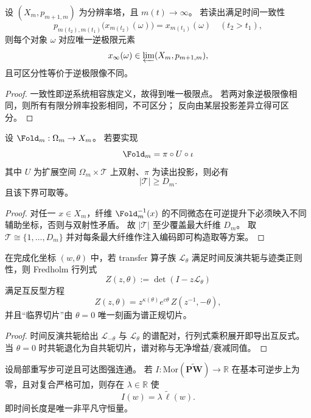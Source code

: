 \begin{theorem}\label{thm:xi-time-consistent-inverse-limit-readout}
设 \((X_m,p_{m+1,m})\) 为分辨率塔，且 \(m(t)\to\infty\)。
若读出满足时间一致性
\[
p_{m(t_2),m(t_1)}\bigl(x_{m(t_2)}(\omega)\bigr)=x_{m(t_1)}(\omega)\quad(t_2>t_1),
\]
则每个对象 \(\omega\) 对应唯一逆极限元素
\[
x_\infty(\omega)\in \varprojlim(X_m,p_{m+1,m}),
\]
且可区分性等价于逆极限像不同。
\end{theorem}

\begin{proof}
一致性即逆系统相容族定义，故得到唯一极限点。
若两对象逆极限像相同，则所有有限分辨率投影相同，不可区分；
反向由某层投影差异立得可区分。
\end{proof}

\begin{theorem}[时间纤维最小维数定理]\label{thm:xi-time-fiber-minimal-dimension}
设 \(\Fold_m:\Omega_m\to X_m\)。
若要实现
\[
\Fold_m=\pi\circ U\circ\iota
\]
其中 \(U\) 为扩展空间 \(\Omega_m\times\mathcal T\) 上双射、\(\pi\) 为读出投影，则必有
\[
|\mathcal T|\ge D_m.
\]
且该下界可取等。
\end{theorem}

\begin{proof}
对任一 \(x\in X_m\)，纤维 \(\Fold_m^{-1}(x)\) 的不同微态在可逆提升下必须映入不同辅助坐标，否则与双射性矛盾。
故 \(|\mathcal T|\) 至少覆盖最大纤维 \(D_m\)。
取 \(\mathcal T\cong\{1,\dots,D_m\}\) 并对每条最大纤维作注入编码即可构造取等方案。
\end{proof}

\begin{proposition}[时间反演参数化下的谱互反律]\label{prop:xi-time-reversal-spectral-reciprocity}
在完成化坐标 \((w,\theta)\) 中，若 transfer 算子族 \(\mathcal L_\theta\) 满足时间反演共轭与迹类正则性，则 Fredholm 行列式
\[
Z(z,\theta):=\det(I-z\mathcal L_\theta)
\]
满足互反型方程
\[
Z(z,\theta)=z^{\kappa(\theta)}e^{c\theta}\,Z(z^{-1},-\theta),
\]
并且“临界切片”由 \(\theta=0\) 唯一刻画为谱正规切片。
\end{proposition}

\begin{proof}
时间反演共轭给出 \(\mathcal L_{-\theta}\) 与 \(\mathcal L_\theta\) 的谱配对，行列式乘积展开即导出互反式。
当 \(\theta=0\) 时共轭退化为自共轭切片，谱对称与无净增益/衰减同值。
\end{proof}

\begin{theorem}[微可逆且不可约时的守恒量退化]\label{thm:xi-time-only-conserved-quantity}
设局部重写步可逆且可达图强连通。
若 \(I:\mathrm{Mor}(\widetilde{\mathbf{PW}})\to\mathbb R\) 在基本可逆步上为零，且对复合严格可加，则存在 \(\lambda\in\mathbb R\) 使
\[
I(w)=\lambda\,\widetilde\ell(w).
\]
即时间长度是唯一非平凡守恒量。
\end{theorem}

